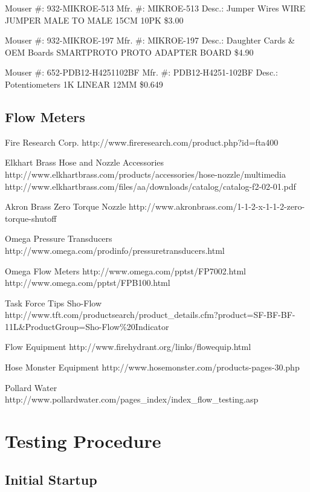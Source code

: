 \documentclass[11pt,oneside]{book}
\begin{document}
Mouser \#:   932-MIKROE-513  
Mfr. \#: MIKROE-513
Desc.:  Jumper Wires WIRE JUMPER MALE TO MALE 15CM 10PK
\$3.00

Mouser \#:   932-MIKROE-197  
Mfr. \#: MIKROE-197
Desc.:  Daughter Cards \& OEM Boards SMARTPROTO PROTO ADAPTER BOARD
\$4.90

Mouser \#:   652-PDB12-H4251102BF    
Mfr. \#: PDB12-H4251-102BF
Desc.:  Potentiometers 1K LINEAR 12MM
\$0.649


\section{Flow Meters}

Fire Research Corp.
http://www.fireresearch.com/product.php?id=fta400

Elkhart Brass Hose and Nozzle Accessories
http://www.elkhartbrass.com/products/accessories/hose-nozzle/multimedia
http://www.elkhartbrass.com/files/aa/downloads/catalog/catalog-f2-02-01.pdf

Akron Brass Zero Torque Nozzle
http://www.akronbrass.com/1-1-2-x-1-1-2-zero-torque-shutoff

Omega Pressure Transducers
http://www.omega.com/prodinfo/pressuretransducers.html

Omega Flow Meters
http://www.omega.com/pptst/FP7002.html
http://www.omega.com/pptst/FPB100.html

Task Force Tips Sho-Flow
http://www.tft.com/productsearch/product\_details.cfm?product=SF-BF-BF-11L\&ProductGroup=Sho-Flow\%20Indicator

Flow Equipment
http://www.firehydrant.org/links/flowequip.html

Hose Monster Equipment
http://www.hosemonster.com/products-pages-30.php

Pollard Water
http://www.pollardwater.com/pages\_index/index\_flow\_testing.asp





\appendix

\chapter{Testing Procedure}

\section{Initial Startup}
\end{document}
